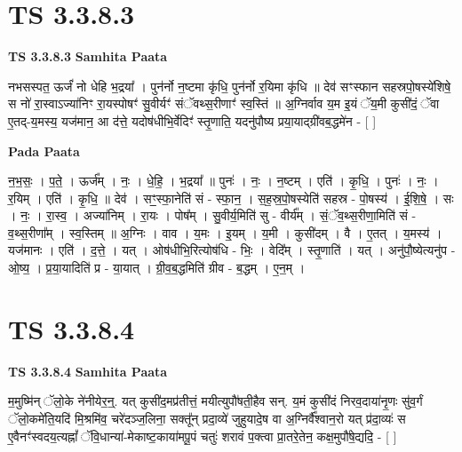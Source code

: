 \documentclass[17pt]{extarticle}
\begin{document}
\section*{ TS 3.3.8.3 }

\textbf{TS 3.3.8.3 } \newline
\textbf{Samhita Paata} \newline

नभसस्पत॒ ऊर्जं॑ नो धेहि भ॒द्रया᳚ । पुन॑र्नो न॒ष्टमा कृ॑धि॒ पुन॑र्नो र॒यिमा कृ॑धि ॥ देव॑ सꣳस्फान सहस्रपो॒षस्ये॑शिषे॒ स नो॑ रा॒स्वाऽज्या॑निꣳ रा॒यस्पोषꣳ॑ सु॒वीर्यꣳ॑ संॅवथ्स॒रीणाꣳ॑ स्व॒स्तिं ॥ अ॒ग्निर्वाव य॒म इ॒यं ॅय॒मी कुसी॑दं॒ ॅवा ए॒तद्-य॒मस्य॒ यज॑मान॒ आ द॑त्ते॒ यदोष॑धीभि॒र्वेदिꣳ॑ स्तृ॒णाति॒ यदनु॑पौष्य प्रया॒याद्ग्री॑वब॒द्धमे॑न - [  ] \newline

\textbf{Pada Paata} \newline

न॒भ॒सः॒ । प॒ते॒ । ऊर्ज᳚म् । नः॒ । धे॒हि॒ । भ॒द्रया᳚ ॥ पुनः॑ । नः॒ । न॒ष्टम् । एति॑ । कृ॒धि॒ । पुनः॑ । नः॒ । र॒यिम् । एति॑ । कृ॒धि॒ ॥ देव॑ । सꣳ॒॒स्फा॒नेति॑ सं - स्फा॒न॒ । स॒ह॒स्र॒पो॒षस्येति॑ सहस्र - पो॒षस्य॑ । ई॒शि॒षे॒ । सः । नः॒ । रा॒स्व॒ । अज्या॑निम् । रा॒यः । पोष᳚म् । सु॒वीर्य॒मिति॑ सु - वीर्य᳚म् । सं॒ॅव॒थ्स॒रीणा॒मिति॑ सं - व॒थ्स॒रीणा᳚म् । स्व॒स्तिम् ॥ अ॒ग्निः । वाव । य॒मः । इ॒यम् । य॒मी । कुसी॑दम् । वै । ए॒तत् । य॒मस्य॑ । यज॑मानः । एति॑ । द॒त्ते॒ । यत् । ओष॑धीभि॒रित्योष॑धि - भिः॒ । वेदि᳚म् । स्तृ॒णाति॑ । यत् । अनु॑पौ॒ष्येत्यनु॑प - ओ॒ष्य॒ । प्र॒या॒यादिति॑ प्र - या॒यात् । ग्री॒व॒ब॒द्धमिति॑ ग्रीव - ब॒द्धम् । ए॒न॒म् ।  \newline




\section*{ TS 3.3.8.4 }

\textbf{TS 3.3.8.4 } \newline
\textbf{Samhita Paata} \newline

म॒मुष्मि॑न् ॅलो॒के ने॑नीयेर॒न्॒. यत् कुसी॑द॒मप्र॑तीत्तं॒ मयीत्युपौ॑षती॒हैव सन्. य॒मं कुसी॑दं निरव॒दाया॑नृ॒णः सु॑व॒र्गं ॅलो॒कमे॑ति॒यदि॑ मि॒श्रमि॑व॒ चरे॑दञ्ज॒लिना॒ सक्तू᳚न् प्रदा॒व्ये॑ जुहुयादे॒ष वा अ॒ग्निर्वै᳚श्वान॒रो यत् प्र॑दा॒व्यः॑ स ए॒वैनꣳ॑स्वदय॒त्यह्नां᳚ ॅवि॒धान्या॑-मेकाष्ट॒काया॑मपू॒पं चतुः॑ शरावं प॒क्त्वा प्रा॒तरे॒तेन॒ कक्ष॒मुपौ॑षे॒द्यदि॒ - [  ] \newline
\end{document}
